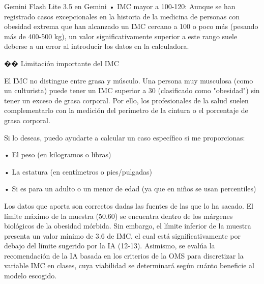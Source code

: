 \documentclass[12pt,a4paper,oneside]{book}
\begin{document}
\begin{iaresp} {Gemini Flash Lite 3.5 en Gemini}
• IMC mayor a 100-120: Aunque se han registrado casos excepcionales en la historia de la medicina de personas con obesidad extrema que han alcanzado un IMC cercano a 100 o poco más (pesando más de 400-500 kg), un valor significativamente superior a este rango suele deberse a un error al introducir los datos en la calculadora.

�� Limitación importante del IMC

El IMC no distingue entre grasa y músculo. Una persona muy musculosa (como un culturista) puede tener un IMC superior a 30 (clasificado como "obesidad") sin tener un exceso de grasa corporal. Por ello, los profesionales de la salud suelen complementarlo con la medición del perímetro de la cintura o el porcentaje de grasa corporal.

Si lo deseas, puedo ayudarte a calcular un caso específico si me proporcionas:

• El peso (en kilogramos o libras)

• La estatura (en centímetros o pies/pulgadas)

• Si es para un adulto o un menor de edad (ya que en niños se usan percentiles)
\end{iaresp}
\begin{iaanalisis}
Los datos que aporta son correctos dadas las fuentes de las que lo ha sacado. El límite máximo de la muestra (50.60) se encuentra dentro de los márgenes biológicos de la obesidad mórbida. Sin embargo, el límite inferior de la muestra presenta un valor mínimo de 3.6 de IMC, el cual está significativamente por debajo del límite sugerido por la IA (12-13). Asimismo, se evalúa la recomendación de la IA basada en los criterios de la OMS para discretizar la variable IMC en clases, cuya viabilidad se determinará según cuánto beneficie al modelo escogido.
\end{iaanalisis}
\end{document}
